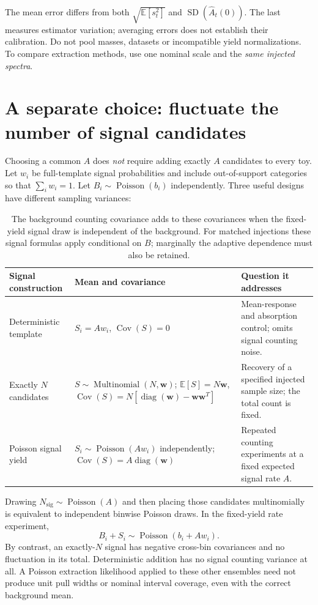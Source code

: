 \documentclass[11pt]{article}
\newcommand{\E}{\mathbb E}
\newcommand{\Cov}{\operatorname{Cov}}
\newcommand{\Pois}{\operatorname{Poisson}}
\newcommand{\Ah}{\widehat A}
\begin{document}
The mean error differs from both $\sqrt{\E[s_t^2]}$ and
$\operatorname{SD}(\Ah_t(0))$. The last measures estimator variation;
averaging errors does not establish their calibration. Do not pool masses,
datasets or incompatible yield normalizations. To compare extraction
methods, use one nominal scale and the \emph{same injected spectra}.

\clearpage
\section{A separate choice: fluctuate the number of signal candidates}
Choosing a common $A$ does \emph{not} require adding exactly $A$ candidates
to every toy. Let $w_i$ be full-template signal probabilities and include
out-of-support categories so that $\sum_i w_i=1$. Let
$B_i\sim\Pois(b_i)$ independently. Three useful designs have different
sampling variances:

\begin{table}[H]\centering\small
\begin{tabularx}{\linewidth}{@{}l >{\raggedright\arraybackslash}X >{\raggedright\arraybackslash}X@{}}
\toprule
Signal construction & Mean and covariance & Question it addresses\\
\midrule
Deterministic template &
$S_i=A w_i$, $\Cov(S)=0$ &
Mean-response and absorption control; omits signal counting noise.\\[4pt]
Exactly $N$ candidates &
$S\sim\operatorname{Multinomial}(N,\bm w)$;
$\E[S]=N\bm w$,
$\Cov(S)=N[\operatorname{diag}(\bm w)-\bm w\bm w^T]$ &
Recovery of a specified injected sample size; the total count is fixed.\\[4pt]
Poisson signal yield &
$S_i\sim\Pois(Aw_i)$ independently;
$\Cov(S)=A\operatorname{diag}(\bm w)$ &
Repeated counting experiments at a fixed expected signal rate $A$.\\
\bottomrule
\end{tabularx}
\caption{The background counting covariance adds to these covariances when
the fixed-yield signal draw is independent of the background. For matched
injections these signal formulas apply conditional on $B$; marginally the
adaptive dependence must also be retained.}
\end{table}

Drawing $N_{\mathrm{sig}}\sim\Pois(A)$ and then placing those candidates
multinomially is equivalent to independent binwise Poisson draws. In the
fixed-yield rate experiment,
\begin{equation}
 B_i+S_i\sim\Pois(b_i+A w_i).
 \label{eq:poisson}
\end{equation}
By contrast, an exactly-$N$ signal has negative cross-bin covariances and
no fluctuation in its total. Deterministic addition has no signal counting
variance at all. A Poisson extraction likelihood applied to these other
ensembles need not produce unit pull widths or nominal interval coverage,
even with the correct background mean.
\end{document}
